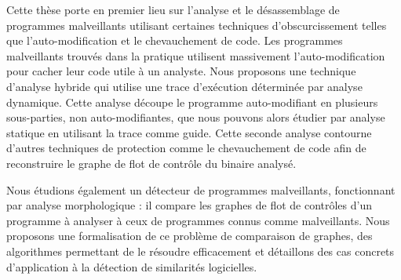 Cette thèse porte en premier lieu sur l'analyse et le désassemblage de programmes malveillants utilisant certaines techniques d'obscurcissement telles que l'auto-modification et le chevauchement de code.
Les programmes malveillants trouvés dans la pratique utilisent massivement l'auto-modification pour cacher leur code utile à un analyste.
Nous proposons une technique d'analyse hybride qui utilise une trace d'exécution déterminée par analyse dynamique.
Cette analyse découpe le programme auto-modifiant en plusieurs sous-parties, non auto-modifiantes, que nous pouvons alors étudier par analyse statique en utilisant la trace comme guide.
Cette seconde analyse contourne d'autres techniques de protection comme le chevauchement de code afin de reconstruire le graphe de flot de contrôle du binaire analysé.

Nous étudions également un détecteur de programmes malveillants, fonctionnant par analyse morphologique : il compare les graphes de flot de contrôles d'un programme à analyser à ceux de programmes connus comme malveillants.
Nous proposons une formalisation de ce problème de comparaison de graphes, des algorithmes permettant de le résoudre efficacement et détaillons des cas concrets d'application à la détection de similarités logicielles.